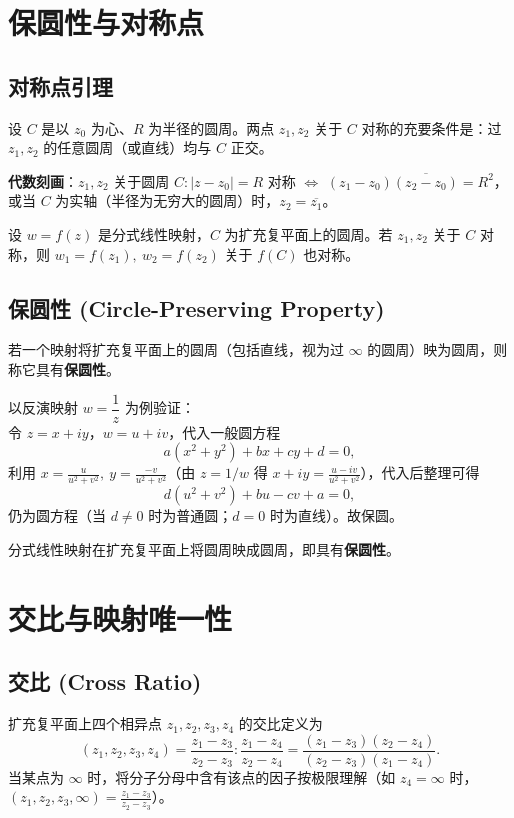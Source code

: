 \section{保圆性与对称点}
\subsection{对称点引理}
\begin{lemma}[对称点引理]
  设 \(C\) 是以 \(z_0\) 为心、\(R\) 为半径的圆周。两点 \(z_1, z_2\) 关于 \(C\) 对称的充要条件是：过 \(z_1, z_2\) 的任意圆周（或直线）均与 \(C\) 正交。
\end{lemma}

\textbf{代数刻画}：\(z_1,z_2\) 关于圆周 \(C: |z - z_0| = R\) 对称 \(\iff\) \((z_1 - z_0)\overline{(z_2 - z_0)} = R^2\)，或当 \(C\) 为实轴（半径为无穷大的圆周）时，\(z_2 = \overline{z_1}\)。

\begin{theorem}[分式线性映射的保对称性]
  设 \(w = f(z)\) 是分式线性映射，\(C\) 为扩充复平面上的圆周。若 \(z_1,z_2\) 关于 \(C\) 对称，则 \(w_1 = f(z_1),\ w_2 = f(z_2)\) 关于 \(f(C)\) 也对称。
\end{theorem}

\subsection{保圆性 (Circle-Preserving Property)}
\begin{definition}[保圆性]
  若一个映射将扩充复平面上的圆周（包括直线，视为过 \(\infty\) 的圆周）映为圆周，则称它具有\textbf{保圆性}。
\end{definition}

以反演映射 \(w = \dfrac{1}{z}\) 为例验证：\\
令 \(z = x + iy\)，\(w = u + iv\)，代入一般圆方程
\[
a(x^2+y^2) + bx + cy + d = 0,
\]
利用 \(x = \frac{u}{u^2+v^2},\ y = \frac{-v}{u^2+v^2}\)（由 \(z = 1/w\) 得 \(x+iy = \frac{u-iv}{u^2+v^2}\)），代入后整理可得
\[
d(u^2+v^2) + bu - cv + a = 0,
\]
仍为圆方程（当 \(d \neq 0\) 时为普通圆；\(d=0\) 时为直线）。故保圆。

\begin{remark}
  分式线性映射在扩充复平面上将圆周映成圆周，即具有\textbf{保圆性}。
\end{remark}

\section{交比与映射唯一性}
\subsection{交比 (Cross Ratio)}
扩充复平面上四个相异点 \(z_1,z_2,z_3,z_4\) 的交比定义为
\[
(z_1, z_2, z_3, z_4) = \frac{z_1 - z_3}{z_2 - z_3} : \frac{z_1 - z_4}{z_2 - z_4}
= \frac{(z_1 - z_3)(z_2 - z_4)}{(z_2 - z_3)(z_1 - z_4)}.
\]
当某点为 \(\infty\) 时，将分子分母中含有该点的因子按极限理解（如 \(z_4 = \infty\) 时，\((z_1,z_2,z_3,\infty) = \frac{z_1 - z_3}{z_2 - z_3}\)）。

